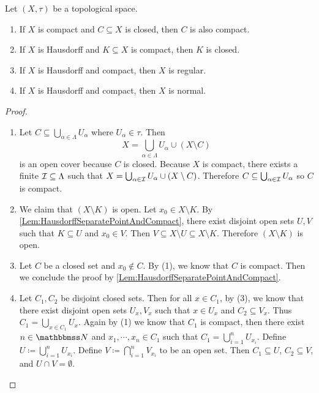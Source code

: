 \documentclass[screen,single]{techreport}
\numberwithin{equation}{section}
\begin{document}
\begin{proposition}\label{Prop:SeveralPropertiesOfCompactness}
	Let $(X,\tau)$ be a topological space.
	\begin{enumerate}
		\item If $X$ is compact and $C \subseteq X$ is closed, then $C$ is also compact.
		\item If $X$ is Hausdorff and $K \subseteq X$ is compact, then $K$ is closed.
		\item If $X$ is Hausdorff and compact, then $X$ is regular.
		\item If $X$ is Hausdorff and compact, then $X$ is normal.
	\end{enumerate}
\end{proposition}
\begin{proof}\
	\begin{enumerate}
		\item Let $C \subseteq \bigcup_{\alpha \in \Lambda} U_\alpha$ where $U_\alpha \in \tau$. Then
		\[
		X = \bigcup_{\alpha \in \Lambda} U_\alpha \cup (X \setminus C)
		\]
		is an open cover because $C$ is closed.
		Because $X$ is compact, there exists a finite $\mathcal{I} \subseteq \Lambda$ such that $X = \bigcup_{\alpha \in \mathcal{I}} U_\alpha \cup (X \setminus C)$.
		Therefore $C \subseteq \bigcup_{\alpha \in \mathcal{I}} U_\alpha$ so $C$ is compact.
		
		\item We claim that $(X \setminus K)$ is open.
		Let $x_0 \in X \setminus K$.
		By \cref{Lem:HausdorffSeparatePointAndCompact}, there exist disjoint open sets $U,V$ such that $K \subseteq U$ and $x_0 \in V$.
		Then $V \subseteq X \setminus U \subseteq X \setminus K$.
		Therefore $(X \setminus K)$ is open.
		
		\item Let $C$ be a closed set and $x_0 \not\in C$.
		By (1), we know that $C$ is compact.
		Then we conclude the proof by \cref{Lem:HausdorffSeparatePointAndCompact}.
		
		\item Let $C_1,C_2$ be disjoint closed sets.
		Then for all $x \in C_1$, by (3), we know that there exist disjoint open sets $U_x,V_x$ such that $x \in U_x$ and $C_2 \subseteq V_x$.
		Thus $C_1 = \bigcup_{x \in C_1} U_x$.
		Again by (1) we know that $C_1$ is compact, then there exist $n \in \bbN$ and $x_1,\cdots,x_n \in C_1$ such that $C_1 = \bigcup_{i=1}^n U_{x_i}$.
		Define $U \coloneqq \bigcup_{i=1}^n U_{x_i}$.
		Define $V \coloneqq \bigcap_{i=1}^n V_{x_i}$ to be an open set.
		Then $C_1 \subseteq U$, $C_2 \subseteq V$, and $U \cap V =\emptyset$.
	\end{enumerate}
\end{proof}
\end{document}
